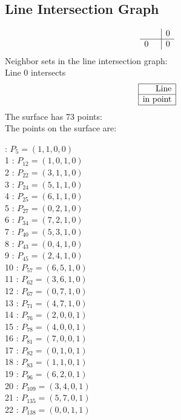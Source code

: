 \documentclass{article}
\begin{document}
{\subsection*{Line Intersection Graph}
{\arraycolsep=1pt
$$
\begin{array}{rr|*{1}r}
 &  & 0\\
\hline
0 &  & 0\\
\end{array}
$$
}%
Neighbor sets in the line intersection graph:\\
Line 0 intersects 
$$
\begin{array}{|r*{0}{|c}|}
\hline
\mbox{Line} \\
\hline
\mbox{in point} \\
\hline
\end{array}
$$
The surface has 73 points:\\
The points on the surface are:\\
\begin{multicols}{3}
 : $P_{5}=( 1, 1, 0, 0 )$\\
1 : $P_{12}=( 1, 0, 1, 0 )$\\
2 : $P_{22}=( 3, 1, 1, 0 )$\\
3 : $P_{24}=( 5, 1, 1, 0 )$\\
4 : $P_{25}=( 6, 1, 1, 0 )$\\
5 : $P_{27}=( 0, 2, 1, 0 )$\\
6 : $P_{34}=( 7, 2, 1, 0 )$\\
7 : $P_{40}=( 5, 3, 1, 0 )$\\
8 : $P_{43}=( 0, 4, 1, 0 )$\\
9 : $P_{45}=( 2, 4, 1, 0 )$\\
10 : $P_{57}=( 6, 5, 1, 0 )$\\
11 : $P_{62}=( 3, 6, 1, 0 )$\\
12 : $P_{67}=( 0, 7, 1, 0 )$\\
13 : $P_{71}=( 4, 7, 1, 0 )$\\
14 : $P_{76}=( 2, 0, 0, 1 )$\\
15 : $P_{78}=( 4, 0, 0, 1 )$\\
16 : $P_{81}=( 7, 0, 0, 1 )$\\
17 : $P_{82}=( 0, 1, 0, 1 )$\\
18 : $P_{83}=( 1, 1, 0, 1 )$\\
19 : $P_{96}=( 6, 2, 0, 1 )$\\
20 : $P_{109}=( 3, 4, 0, 1 )$\\
21 : $P_{135}=( 5, 7, 0, 1 )$\\
22 : $P_{138}=( 0, 0, 1, 1 )$\\

\end{multicols}}
\end{document}
